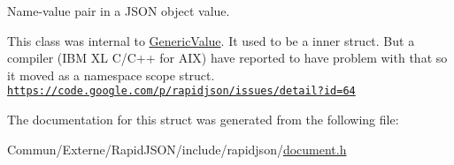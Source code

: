 Name-\/value pair in a J\+S\+ON object value. 

This class was internal to \hyperlink{class_generic_value}{Generic\+Value}. It used to be a inner struct. But a compiler (I\+BM XL C/\+C++ for A\+IX) have reported to have problem with that so it moved as a namespace scope struct. \href{https://code.google.com/p/rapidjson/issues/detail?id=64}{\tt https\+://code.\+google.\+com/p/rapidjson/issues/detail?id=64} 

The documentation for this struct was generated from the following file\+:\begin{DoxyCompactItemize}
\item 
Commun/\+Externe/\+Rapid\+J\+S\+O\+N/include/rapidjson/\hyperlink{document_8h}{document.\+h}\end{DoxyCompactItemize}
